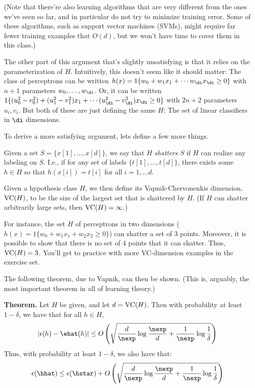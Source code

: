 (Note that there're also learning algorithms that are very different from the ones we've seen so far, 
and in particular do not try to minimize training error.  Some of these algorithms, such as support vector
machines (SVMs), might require far fewer training examples that $O(d)$, but we won't have time to cover them 
in this class.)

The other part of this argument that's slightly unsatisfying is that 
it relies on the parameterization of $H$.  
Intuitively, this doesn't seem like it should matter: The class of perceptrons can be written
$h(x) = 1\{w_0 + w_1 x_1 + \cdots w_{\di} x_{\di} \geq 0\}$ with $n+1$ parameters $w_0, \ldots, w_{\di}$.  
Or, it can be written 
$1\{(u^2_0 - v^2_0) + (u^2_1 - v^2_1) x_1 + \cdots (u^2_{\di} - v^2_{\di}) x_{\di} \geq 0\}$ with $2n+2$ parameters $u_i, v_i$. 
But both of these are just defining the same $H$: The set of linear classifiers in $\di$ dimensions. 

To derive a more satisfying argument, lets define a few more things.

Given a set $S = \{x[1], \ldots, x[d]\}$, we say that $H$ \emph{shatters} $S$ if $H$ can realize any
labeling on $S$. I.e., if for any set of labels $\{t[1], \ldots, t[d]\}$,
there exists
some $h \in H$ so that $h(x[i]) = t[i]$ for all $i=1,\ldots d$. 

Given a hypothesis class $H$, we then define its Vapnik-Chervonenkis dimension, ${\rm VC}(H)$, to be the
size of the largest set that is shattered by $H$.  (If $H$ can shatter arbitrarily large sets, then 
${\rm VC}(H) = \infty$.)

For instance, the set $H$ of perceptrons in two dimensions ($h(x) = 1\{w_0 + w_1 x_1 + w_2 x_2\geq 0 \}$) can shatter a 
set of 3 points.   
Moreover, it is possible to show that there is no set of 4 points that it can shatter.  Thus, ${\rm VC}(H)=3$. 
You'll get to practice with more VC-dimension examples in the exercise set.  

The following theorem, due to Vapnik, can then be shown.  (This is, arguably, the most important
theorem in all of learning theory.) 

\noindent
{\bf Theorem.}
Let $H$ be given, and let $d = {\rm VC}(H)$.  Then with probability at least $1-\delta$, we
have that for all $h \in H$, 
\[
|\epsilon(h) - \ehat(h)| \leq O\left(\sqrt{\frac{d}{\nexp}\log\frac{\nexp}{d} + \frac{1}{\nexp}\log\frac{1}{\delta}}\right)
\]
Thus, with probability at least $1-\delta$, we also have that:
\[
\epsilon(\hhat) \leq \epsilon(\hstar) + O\left(\sqrt{\frac{d}{\nexp}\log\frac{\nexp}{d} + \frac{1}{\nexp}\log\frac{1}{\delta}}\right)
\]

